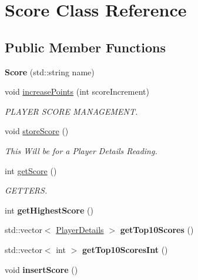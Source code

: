\hypertarget{class_score}{}\section{Score Class Reference}
\label{class_score}
\subsection*{Public Member Functions}
\begin{DoxyCompactItemize}
\item 
\mbox{\label{class_score_a7511b13acf59479d50c2c202d579168c}} 
{\bfseries Score} (std\+::string name)
\item 
\mbox{\label{class_score_a017f4ad80df1e9d51e62789d8e5e9605}} 
void \hyperlink{class_score_a017f4ad80df1e9d51e62789d8e5e9605}{increase\+Points} (int score\+Increment)
\begin{DoxyCompactList}\small\item\em P\+L\+A\+Y\+ER S\+C\+O\+RE M\+A\+N\+A\+G\+E\+M\+E\+NT. \end{DoxyCompactList}\item 
\mbox{\label{class_score_a8cc9e62ee4d086c0f2e1b8ef6d2cbf8d}} 
void \hyperlink{class_score_a8cc9e62ee4d086c0f2e1b8ef6d2cbf8d}{store\+Score} ()
\begin{DoxyCompactList}\small\item\em This Will be for a Player Details Reading. \end{DoxyCompactList}\item 
\mbox{\label{class_score_a8627c93270c188a3fd28a25b1d07a9e7}} 
int \hyperlink{class_score_a8627c93270c188a3fd28a25b1d07a9e7}{get\+Score} ()
\begin{DoxyCompactList}\small\item\em G\+E\+T\+T\+E\+RS. \end{DoxyCompactList}\item 
\mbox{\label{class_score_afb50f4e2cb31006d23d3281dd1703880}} 
int {\bfseries get\+Highest\+Score} ()
\item 
\mbox{\label{class_score_a13094831f08b313321193e212862417b}} 
std\+::vector$<$ \hyperlink{struct_player_details}{Player\+Details} $>$ {\bfseries get\+Top10\+Scores} ()
\item 
\mbox{\label{class_score_a5f1d05dd49200b53b806751a6e9d6fbe}} 
std\+::vector$<$ int $>$ {\bfseries get\+Top10\+Scores\+Int} ()
\item 
\mbox{\label{class_score_ab207e77378c558c261526487aa725db9}} 
void {\bfseries insert\+Score} ()
\end{DoxyCompactItemize}


